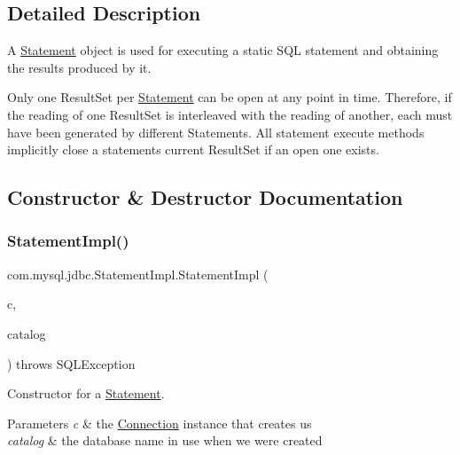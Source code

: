 \subsection{Detailed Description}
A \mbox{\hyperlink{interfacecom_1_1mysql_1_1jdbc_1_1_statement}{Statement}} object is used for executing a static S\+QL statement and obtaining the results produced by it.

Only one Result\+Set per \mbox{\hyperlink{interfacecom_1_1mysql_1_1jdbc_1_1_statement}{Statement}} can be open at any point in time. Therefore, if the reading of one Result\+Set is interleaved with the reading of another, each must have been generated by different Statements. All statement execute methods implicitly close a statement\textquotesingle{}s current Result\+Set if an open one exists. 

\subsection{Constructor \& Destructor Documentation}
\mbox{\label{classcom_1_1mysql_1_1jdbc_1_1_statement_impl_a2d3783c9f776e2eb863b449b21825b4d}} 
\subsubsection{\texorpdfstring{Statement\+Impl()}{StatementImpl()}}
{\footnotesize\ttfamily com.\+mysql.\+jdbc.\+Statement\+Impl.\+Statement\+Impl (\begin{DoxyParamCaption}\item[{\mbox{\hyperlink{interfacecom_1_1mysql_1_1jdbc_1_1_my_s_q_l_connection}{My\+S\+Q\+L\+Connection}}}]{c,  }\item[{String}]{catalog }\end{DoxyParamCaption}) throws S\+Q\+L\+Exception}

Constructor for a \mbox{\hyperlink{interfacecom_1_1mysql_1_1jdbc_1_1_statement}{Statement}}.


\begin{DoxyParams}{Parameters}
{\em c} & the \mbox{\hyperlink{interfacecom_1_1mysql_1_1jdbc_1_1_connection}{Connection}} instance that creates us \\
\hline
{\em catalog} & the database name in use when we were created\\
\hline
\end{DoxyParams}

